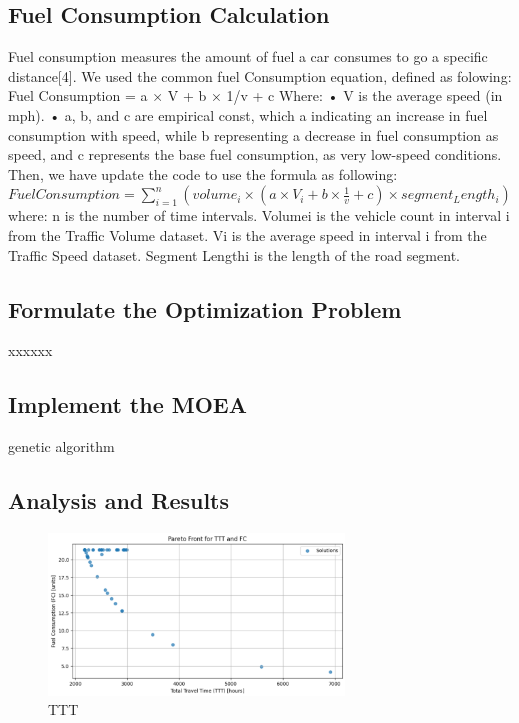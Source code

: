 \newline




\subsection{Fuel Consumption Calculation}
Fuel consumption measures the amount of fuel a car consumes to go a specific distance[4]. 
We used the common fuel Consumption equation, defined as folowing:
\newline
\newline
Fuel Consumption = a × V + b × 1/v + c
\newline
Where: 
\newline
\newline
• V is the average speed (in mph). 
\newline
• a, b, and c are empirical const, which a indicating an increase in fuel consumption with speed, while b representing a decrease in fuel consumption as speed, and c represents the base fuel consumption, as very low-speed conditions.
\newline
\newline
Then, we have update the code to use the formula as following:
$Fuel Consumption=\sum_{i=1}^{n}  (volume_{i} \times (a×V_{i}+b×\frac{1}{v}+c)\times segment_Length_{i})$
\newline
\newline
where:
n is the number of time intervals. 
Volumei is the vehicle count in interval i from the Traffic 
Volume dataset. 
Vi is the average speed in interval i from the Traffic Speed dataset. 
Segment Lengthi is the length of the road segment.
\subsection{Formulate the Optimization Problem}
xxxxxx
\subsection{Implement the MOEA}
genetic algorithm
\subsection{Analysis and Results}

\begin{figure}[h]
    \centering
    \includegraphics[width=0.7\textwidth]{figures/TTT.PNG}
    \caption{TTT}
    \label{fig:Total Travel Time}
\end{figure}

